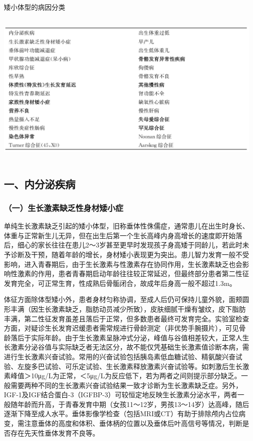 \begin{table}[htbp]
\centering
\caption{矮小体型的病因分类}
\label{tab40-2}
\includegraphics[width=5.91667in,height=3.03125in]{./images/Image00249.jpg}
\end{table}

\subsection{一、内分泌疾病}

\subsubsection{（一）生长激素缺乏性身材矮小症}

单纯生长激素缺乏引起的矮小体型，旧称垂体性侏儒症，通常患儿在出生时身长、体重与正常新生儿无异，但在出生后第一个生长高峰内身高增长的速度即开始落后，细心的家长往往在患儿2～3岁甚至更早时发现孩子身高矮于同龄儿，若此时未予诊断及干预，随着年龄的增长，身材矮小表现更为突出。患儿智力发育一般不受影响，进入青春期后，由于生长激素与性激素存在协同作用，生长激素缺乏也会影响性激素的作用，患者青春期启动年龄往往较正常延迟，但最终部分患者第二性征发育完全，可正常生育，性成熟后骨骺闭合，故成年后身高一般不超过1.3m。

体征方面除体型矮小外，患者身材匀称协调，至成人后仍可保持儿童外貌，面颊圆形丰满（因生长激素缺乏，脂肪动员减少所致），皮肤细腻干燥有皱纹，皮下脂肪丰满，第二性征发育虽差且落后于正常，但多数患者最终可发育完全。实验室检查方面，对疑诊生长发育迟缓患者需常规进行骨龄测定（非优势手腕摄片），可见骨龄落后于实际年龄。由于生长激素呈脉冲式分泌，峰值与谷值相差较大，正常人生长激素分泌谷值与实际缺乏者无法区分，故不能仅凭基础生长激素值诊断本病，需进行生长激素兴奋试验。常用的兴奋试验包括胰岛素低血糖试验、精氨酸兴奋试验、左旋多巴试验、可乐定试验、生长激素释放激素兴奋试验等。如刺激后生长激素峰值＞10μg/L为正常，＜5μg/L为反应低下，若为两者之间则提示部分缺乏。一般需要两种不同的生长激素兴奋试验结果一致才诊断为生长激素缺乏症。另外，IGF-1及IGF结合蛋白-3（IGFBP-3）可较恒定地反映生长激素分泌水平，两者一般随年龄而升高，于青春发育中期（女孩11～12岁，男孩13～14岁）达高峰，随后逐渐下降至成人水平。垂体影像学检查（包括MRI或CT）有助于排除颅内占位病变，需注意垂体的高度和体积、垂体柄的位置以及垂体后叶高信号等情况，判断是否存在先天性垂体发育不良等。


